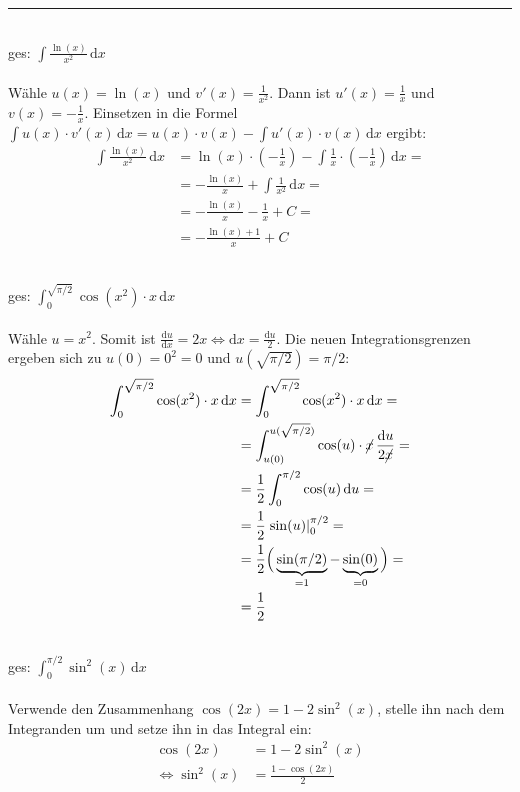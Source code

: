 \documentclass{article}
\newcommand{\diff}{\mathrm{d}}
\newcommand{\lr}[1]{\left(#1\right)}
\begin{document}
{\color{blue}
\hrule
	\\
	ges: $\int \frac{\ln(x)}{x^2} \, \diff x$\\
	\\
	Wähle $u(x) = \ln(x)$ und $v'(x) = \frac{1}{x^2}$. Dann ist $u'(x) = \frac{1}{x}$ und $v(x) = -\frac{1}{x}$. Einsetzen in die Formel $\int u(x) \cdot v'(x) \, \diff x = u(x) \cdot v(x) - \int u'(x) \cdot v(x) \, \diff x$ ergibt:
		\begin{align*}
			\int \frac{\ln(x)}{x^2} \, \diff x &= \ln(x) \cdot \lr{ -\frac{1}{x} } - \int \frac{1}{x} \cdot \lr{ -\frac{1}{x} } \, \diff x = \\
			&= -\frac{\ln(x)}{x} + \int \frac{1}{x^2} \, \diff x = \\
			&= -\frac{\ln(x)}{x} - \frac{1}{x} + C = \\
			&= -\frac{\ln(x)+1}{x} + C
		\end{align*}


	\\
	ges: $\int_0^{\sqrt{\pi/2}} \cos(x^2) \cdot x \, \diff x$\\
	\\
	Wähle $u=x^2$. Somit ist $\frac{\diff u}{\diff x} = 2x \Leftrightarrow \diff x = \frac{\diff u}{2}$. Die neuen Integrationsgrenzen ergeben sich zu $u(0) = 0^2 = 0$ und $u(\sqrt{\pi/2}) = \pi/2$:
		\begin{align*}
			\int_0^{\sqrt{\pi/2}} \cos(x^2) \cdot x \, \diff x &= \int_0^{\sqrt{\pi/2}} \cos(x^2) \cdot x \, \diff x = \\
			&= \int_{u(0)}^{u(\sqrt{\pi/2})} \cos(u) \cdot \cancel{x} \, \frac{\diff u}{2 \cancel{x} } = \\
			&= \frac{1}{2} \int_0^{\pi/2} \cos(u) \, \diff u = \\
			&=\frac{1}{2} \left. \sin(u) \right|_0^{\pi/2} = \\
			&= \frac{1}{2} \Big( \underbrace{ \sin(\pi/2) }_{=1} - \underbrace{ \sin(0) }_{=0} \Big) = \\
			&= \frac{1}{2}
		\end{align*}


	\\
	ges: $\int_0^{\pi/2} \sin^2(x) \, \diff x$\\
	\\
	Verwende den Zusammenhang $\cos(2x) = 1 - 2\sin^2(x)$, stelle ihn nach dem Integranden um und setze ihn in das Integral ein:
		\begin{align*}
			\cos(2x) &= 1 - 2\sin^2(x) \\
			\Leftrightarrow \sin^2(x) &= \frac{1 - \cos(2x)}{2}
		\end{align*}


}
\end{document}
